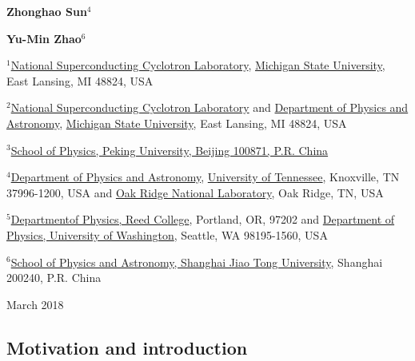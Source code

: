 \documentclass[%
oneside,                 %
final,                   %
10pt]{article}
\begin{document}
\begin{center}
{\bf Zhonghao Sun${}^{4}$} \\ [0mm]
\end{center}


\begin{center}
{\bf Yu-Min Zhao${}^{6}$} \\ [0mm]
\end{center}

\begin{center}
\centerline{{\small ${}^1$\href{{http://www.nscl.msu.edu/}}{National Superconducting Cyclotron Laboratory}, \href{{http://www.msu.edu/}}{Michigan State University}, East Lansing, MI 48824, USA}}
\centerline{{\small ${}^2$\href{{http://www.nscl.msu.edu/}}{National Superconducting Cyclotron Laboratory} and \href{{https://www.pa.msu.edu/}}{Department of Physics and Astronomy}, \href{{http://www.msu.edu/}}{Michigan State University}, East Lansing, MI 48824, USA}}
\centerline{{\small ${}^3$\href{{http://english.pku.edu.cn/}}{School of Physics, Peking University, Beijing 100871, P.R. China}}}
\centerline{{\small ${}^4$\href{{https://www.phys.utk.edu/}}{Department of Physics and Astronomy}, \href{{http://www.utk.edu/}}{University of Tennessee}, Knoxville, TN 37996-1200, USA and \href{{http://www.ornl.gov/}}{Oak Ridge National Laboratory}, Oak Ridge, TN, USA}}
\centerline{{\small ${}^5$\href{{http://www.reed.edu/}}{Departmentof Physics, Reed College}, Portland, OR, 97202 and \href{{https://sharepoint.washington.edu/phys/Pages/default.aspx}}{Department of Physics, University of Washington}, Seattle, WA 98195-1560, USA}}
\centerline{{\small ${}^6$\href{{http://www.physics.sjtu.edu.cn/en/about/news/3}}{School of Physics and Astronomy, Shanghai Jiao Tong University}, Shanghai 200240, P.R. China}}
\end{center}
    


\begin{center}
March 2018
\end{center}

\vspace{1cm}


\subsection*{Motivation and introduction}

\end{document}
